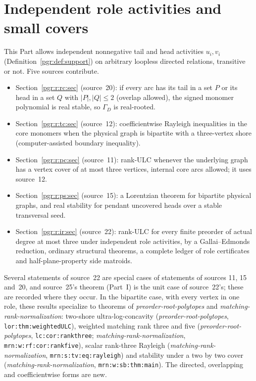 \documentclass[11pt]{article}
\numberwithin{equation}{section}
\theoremstyle{definition}\newtheorem{definition}[theorem]{Definition}\newtheorem{remark}[theorem]{Remark}
\newcommand{\Ga}{\Gamma}                   %
\newcommand{\prp}{\emph{preorder-root-polytopes}}
\newcommand{\mrn}{\emph{matching-rank-normalization}}
\begin{document}
\part{Independent role activities and small covers}\label{pgr:part:two}

This Part allows independent nonnegative tail and head activities $u_i,v_i$
(Definition~\ref{pgr:def:support}) on arbitrary loopless directed
relations, transitive or not. Five sources contribute.
\begin{itemize}[leftmargin=*]
\item Section~\ref{pgr:r:rc:sec} (source~20): if every arc has its tail in
  a set $P$ or its head in a set $Q$ with $|P|,|Q|\le2$ (overlap allowed),
  the signed monomer polynomial is real stable, so $\Ga_D$ is
  real-rooted.
\item Section~\ref{pgr:r:tc:sec} (source~12): coefficientwise Rayleigh
  inequalities in the core monomers when the physical graph is bipartite
  with a three-vertex shore (computer-assisted boundary inequality).
\item Section~\ref{pgr:r:pc:sec} (source~11): rank-ULC whenever the
  underlying graph has a vertex cover of at most three vertices, internal
  core arcs allowed; it uses source~12.
\item Section~\ref{pgr:r:ps:sec} (source~15): a Lorentzian theorem for
  bipartite physical graphs, and real stability for pendant uncovered heads
  over a stable transversal seed.
\item Section~\ref{pgr:r:ir:sec} (source~22): rank-ULC for every finite
  preorder of actual degree at most three under independent role
  activities, by a Gallai--Edmonds reduction, ordinary structural theorems,
  a complete ledger of role certificates and half-plane-property side
  matroids.
\end{itemize}
Several statements of source~22 are special cases of statements of sources
11, 15 and~20, and source~25's theorem (Part~I) is the unit case of
source~22's; these are recorded where they occur. In the bipartite case,
with every vertex in one role, these results specialize to theorems of
\prp{} and \mrn: two-shore ultra-log-concavity (\prp,
\texttt{lor:thm:weightedULC}), weighted matching rank three and five
(\prp, \texttt{lc:cor:rankthree}; \mrn, \texttt{mrn:w:rf:cor:rankfive}),
scalar rank-three Rayleigh (\mrn, \texttt{mrn:s:tv:eq:rayleigh}) and
stability under a two by two cover (\mrn, \texttt{mrn:w:sb:thm:main}). The
directed, overlapping and coefficientwise forms are new.
\end{document}
